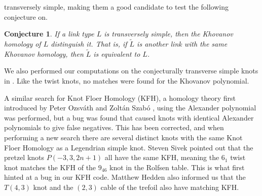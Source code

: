 \documentclass{article}
\theoremstyle{plain}
\newtheorem{conjecture}{Conjecture}
\begin{document}
        transversely simple, making them a good candidate to test the following
        conjecture on.
        \begin{conjecture}
            If a link type $L$ is transversely simple, then the Khovanov
            homology of $L$ distinguish it. That is, if $\tilde{L}$
            is another link with the same Khovanov homology, then $\tilde{L}$ is
            equivalent to $L$.
        \end{conjecture}
        We also performed our computations on the conjecturally transverse
        simple knots in \cite{LegendrianKnotAtlas}. Like the twist knots,
        no matches were found for the Khovanov polynomial.
        \par\hfill\par
        A similar search for Knot Floer Homology (KFH), a homology theory
        first introduced by Peter Ozsv\'{a}th and Zolt\'{a}n Szab\'{o}
        \cite{ozsvathszabo2004}, using the Alexander polynomial
        was performed, but a bug was found that caused knots with identical
        Alexander polynomials to give false negatives. This has been corrected,
        and when performing a new search there are several distinct knots
        with the same Knot Floer Homology as a Legendrian simple knot. Steven
        Sivek pointed
        out that the pretzel knots $P(-3,3,2n+1)$ all have the same KFH, meaning
        the $6_{1}$ twist knot matches the KFH of the $9_{46}$ knot in the
        Rolfsen table. This is what first hinted at a bug in our KFH code.
        Matthew Hedden also informed us that the $T(4,3)$ knot and the
        $(2,3)$ cable of the trefoil also have matching KFH.
\end{document}
